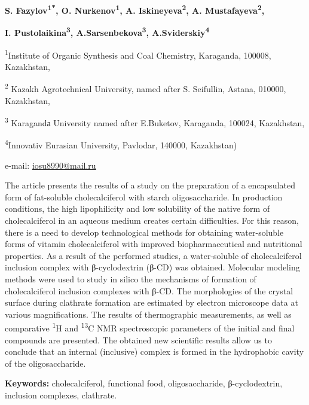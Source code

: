 {\bfseries S. Fazylov\textsuperscript{1*}, O. Nurkenov\textsuperscript{1},
A. Iskineyeva\textsuperscript{2}, A. Mustafayeva\textsuperscript{2},}

{\bfseries I. Pustolaikina\textsuperscript{3},
A.Sarsenbekova\textsuperscript{3}, A.Sviderskiy\textsuperscript{4}}

\textsuperscript{1}Institute of Organic Synthesis and Coal Chemistry,
Karaganda, 100008, Kazakhstan,

\textsuperscript{2} Kazakh Agrotechnical University, named after S.
Seifullin, Astana, 010000, Kazakhstan,

\textsuperscript{3} Karagandа University named after E.Buketov,
Karaganda, 100024, Kazakhstan,

\textsuperscript{4}Innovativ Eurasian University, Pavlodar, 140000,
Kazakhstan)

e-mail: \href{mailto:iosu8990@mail.ru}{\ul{iosu8990@mail.ru}}

The article presents the results of a study on the preparation of a
encapsulated form of fat-soluble cholecalciferol with starch
oligosaccharide. In production conditions, the high lipophilicity and
low solubility of the native form of cholecalciferol in an aqueous
medium creates certain difficulties. For this reason, there is a need to
develop technological methods for obtaining water-soluble forms of
vitamin cholecalciferol with improved biopharmaceutical and nutritional
properties. As a result of the performed studies, a water-soluble of
cholecalciferol inclusion complex with β-cyclodextrin (β-CD) was
obtained. Molecular modeling methods were used to study in silico the
mechanisms of formation of cholecalciferol inclusion complexes with
β-CD. The morphologies of the crystal surface during clathrate formation
are estimated by electron microscope data at various magnifications. The
results of thermographic measurements, as well as comparative
\textsuperscript{1}H and \textsuperscript{13}C NMR spectroscopic
parameters of the initial and final compounds are presented. The
obtained new scientific results allow us to conclude that an internal
(inclusive) complex is formed in the hydrophobic cavity of the
oligosaccharide.

{\bfseries Keywords:} cholecalciferol, functional food, oligosaccharide,
β-cyclodextrin, inclusion complexes, clathrate.

